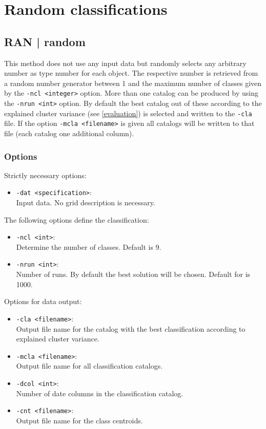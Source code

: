 \documentclass[12pt, oneside, a4paper, headsepline, plainheadsepline]{scrbook}
\begin{document}
\section{Random classifications}

\subsection{RAN | random}
This method does not use any input data but randomly selects any arbitrary number as type number
for each object. The respective number is retrieved from a random number generator between 1 and the 
maximum number of classes given by the \verb+-ncl <integer>+ option.
More than one catalog can be produced by using the \verb+-nrun <int>+ option. By default the best catalog out of these 
according to the explained cluster variance (see \ref{evaluation}) is selected and written to the \verb+-cla+ file. If the option \verb+-mcla <filename>+ is given all catalogs will be written to that file (each catalog one additional column).

\subsubsection*{Options}
Strictly necessary options:
\begin{itemize}
 \item \verb+-dat <specification>+:\\ Input data. No grid description is necessary.
\end{itemize}
The following options define the classification:
\begin{itemize}
 \item \verb+-ncl <int>+:\\ 
 Determine the number of classes. Default is 9.  
 \item \verb+-nrun <int>+:\\ 	
 Number of runs. By default the best solution will be chosen. Default for is 1000.
\end{itemize}
Options for data output:
\begin{itemize}
 \item \verb+-cla <filename>+:\\ Output file name for the catalog with the best classification according to explained cluster variance.
 \item \verb+-mcla <filename>+:\\ Output file name for all classification catalogs.
 \item \verb+-dcol <int>+:\\ Number of date columns in the classification catalog.
 \item \verb+-cnt <filename>+:\\ Output file name for the class centroids.
\end{itemize}
\end{document}
